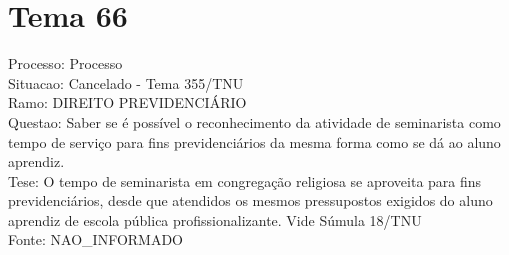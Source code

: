 \documentclass[12pt]{article}
\begin{document}
\section*{Tema 66}
Processo: Processo\\
Situacao: Cancelado - Tema 355/TNU\\
Ramo: DIREITO PREVIDENCIÁRIO\\
Questao: Saber se é possível o reconhecimento da atividade de seminarista como tempo de serviço para fins previdenciários da mesma forma como se dá ao aluno aprendiz.\\
Tese: O tempo de seminarista em congregação religiosa se aproveita para fins previdenciários, desde que atendidos os mesmos pressupostos exigidos do aluno aprendiz de escola pública profissionalizante. Vide Súmula 18/TNU\\
Fonte: NAO\_INFORMADO
\end{document}
